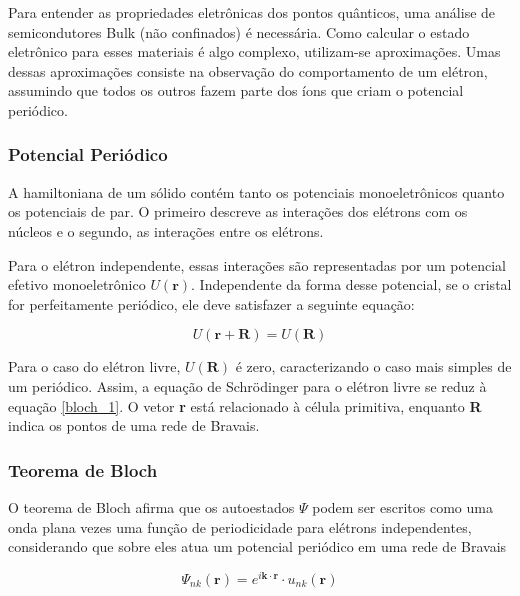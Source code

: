 \par Para entender as propriedades eletrônicas dos pontos quânticos, uma análise de semicondutores Bulk (não confinados) é necessária. Como calcular o estado eletrônico para esses materiais é algo complexo, utilizam-se aproximações. Umas dessas aproximações consiste na observação do comportamento de um elétron, assumindo que todos os outros fazem parte dos íons que criam o potencial periódico.

\subsubsection{Potencial Periódico}

	\par A hamiltoniana\cite{qm_fis5} de um sólido contém tanto os potenciais monoeletrônicos quanto os potenciais de par. O primeiro descreve as interações dos elétrons com os núcleos e o segundo, as interações entre os elétrons. 

	\par Para o elétron independente, essas interações são representadas por um potencial efetivo monoeletrônico $U(\mathbf{r})$. Independente da forma desse potencial, se o cristal for perfeitamente periódico, ele deve satisfazer a seguinte equação:

	\begin{equation}
		\label{bloch_1}
		U(\mathbf{r}+\mathbf{R}) = U(\mathbf{R})
	\end{equation}

	Para o caso do elétron livre, $U(\mathbf{R})$ é zero, caracterizando o caso mais simples de um periódico. Assim, a equação de Schrödinger para o elétron livre se reduz à equação \eqref{bloch_1}. O vetor \textbf{r} está relacionado à célula primitiva, enquanto \textbf{R} indica os pontos de uma rede de Bravais\cite{qm_fis2}.

\subsubsection{Teorema de Bloch}

	\par O teorema de Bloch\cite{qm_fis5} afirma que os autoestados $\Psi$ podem ser escritos como uma onda plana vezes uma função de periodicidade para elétrons independentes, considerando que sobre eles atua um potencial periódico em uma rede de Bravais

	\begin{equation}
		\label{bloch_2}
		\Psi_{nk}(\mathbf{r})= e^{i\mathbf{k} \cdot \mathbf{r}}\cdot u_{nk}(\mathbf{r})
	\end{equation}

